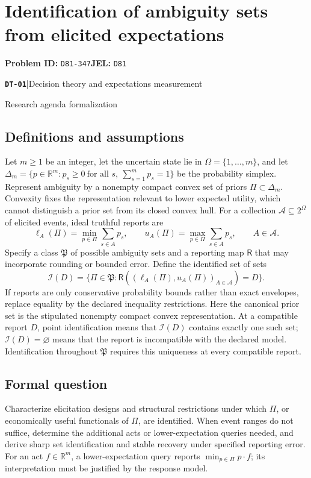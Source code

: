 \documentclass[11pt,a4paper]{article}
\newcommand{\R}{\mathbb R}
\newcommand{\entrymeta}[3]{{\sffamily\small\color{muted}\textbf{\texttt{#1}}\quad|\quad #2\par #3\par}}
\begin{document}
\section*{Identification of ambiguity sets from elicited expectations}
\textbf{Problem ID:} \texttt{D81-347}\quad \textbf{JEL:} \texttt{D81}\par
\label{problem:OP-0586}
\label{beyond:DT-01}
\entrymeta{DT-01}{Decision theory and expectations measurement}{Research agenda formalization}
\subsection*{Definitions and assumptions}
Let $m\geq1$ be an integer, let the uncertain state lie in $\Omega=\{1,\ldots,m\}$, and let $\Delta_m=\{p\in\R^m:p_s\geq0\ \text{for all }s,\ \sum_{s=1}^m p_s=1\}$ be the probability simplex. Represent ambiguity by a nonempty compact convex set of priors $\Pi\subset\Delta_m$. Convexity fixes the representation relevant to lower expected utility, which cannot distinguish a prior set from its closed convex hull. For a collection $\mathcal A\subseteq2^\Omega$ of elicited events, ideal truthful reports are
\[
 \ell_A(\Pi)=\min_{p\in\Pi}\sum_{s\in A}p_s,\qquad
 u_A(\Pi)=\max_{p\in\Pi}\sum_{s\in A}p_s,\qquad A\in\mathcal A.
\]
Specify a class $\mathfrak P$ of possible ambiguity sets and a reporting map $\mathsf R$ that may incorporate rounding or bounded error. Define the identified set of sets
\[
 \mathcal I(D)=\{\Pi\in\mathfrak P:\mathsf R((\ell_A(\Pi),u_A(\Pi))_{A\in\mathcal A})=D\}.
\]
If reports are only conservative probability bounds rather than exact envelopes, replace equality by the declared inequality restrictions. Here the canonical prior set is the stipulated nonempty compact convex representation. At a compatible report $D$, point identification means that $\mathcal I(D)$ contains exactly one such set; $\mathcal I(D)=\varnothing$ means that the report is incompatible with the declared model. Identification throughout $\mathfrak P$ requires this uniqueness at every compatible report.
\subsection*{Formal question}
Characterize elicitation designs and structural restrictions under which $\Pi$, or economically useful functionals of $\Pi$, are identified. When event ranges do not suffice, determine the additional acts or lower-expectation queries needed, and derive sharp set identification and stable recovery under specified reporting error. For an act $f\in\R^m$, a lower-expectation query reports $\min_{p\in\Pi}p\cdot f$; its interpretation must be justified by the response model.
\end{document}
